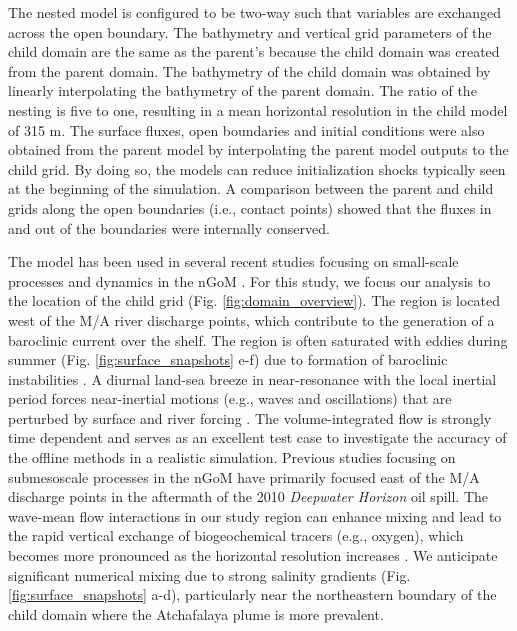 The nested model is configured to be two-way such that variables are exchanged across the open boundary. The bathymetry and vertical grid parameters of the child domain are the same as the parent's because the child domain was created from the parent domain. The bathymetry of the child domain was obtained by linearly interpolating the bathymetry of the parent domain. The ratio of the nesting is five to one, resulting in a mean horizontal resolution in the child model of 315 m. The surface fluxes, open boundaries and initial conditions were also obtained from the parent model by interpolating the parent model outputs to the child grid. By doing so, the models can reduce initialization shocks typically seen at the beginning of the simulation. A comparison between the parent and child grids along the open boundaries (i.e., contact points) showed that the fluxes in and out of the boundaries were internally conserved. 

The model has been used in several recent studies focusing on small-scale processes and dynamics in the nGoM \citep{Kobashi_2020,Qu_2021, Qu_2022_NIW, qu2022rapid, Xomchuk_2020}. For this study, we focus our analysis to the location of the child grid (Fig. \ref{fig:domain_overview}). The region is located west of the M/A river discharge points, which contribute to the generation of a baroclinic current over the shelf. The region is often saturated with eddies during summer (Fig. \ref{fig:surface_snapshots} e-f) due to formation of baroclinic instabilities \citep{Hetland_2017,Zhang_2012_numerical}. A diurnal land-sea breeze in near-resonance with the local inertial period forces near-inertial motions (e.g., waves and oscillations) that are perturbed by surface and river forcing \citep{zhang2009near}. The volume-integrated flow is strongly time dependent and serves as an excellent test case to investigate the accuracy of the offline methods in a realistic simulation. Previous studies focusing on submesoscale processes in the nGoM \citep{Barkan_2017,Luo_2016} have primarily focused east of the M/A discharge points in the aftermath of the 2010 \textit{Deepwater Horizon} oil spill. The wave-mean flow interactions in our study region can enhance mixing and lead to the rapid vertical exchange of biogeochemical tracers (e.g., oxygen), which becomes more pronounced as the horizontal resolution increases \citep{qu2022rapid}. We anticipate significant numerical mixing due to strong salinity gradients (Fig. \ref{fig:surface_snapshots} a-d), particularly near the northeastern boundary of the child domain where the Atchafalaya plume is more prevalent. 

